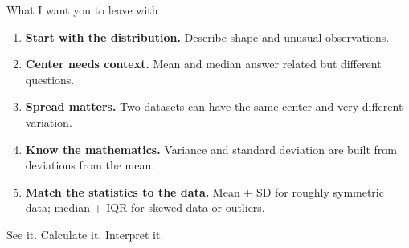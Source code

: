 \documentclass[11pt,aspectratio=169]{beamer}
\begin{document}
\begin{frame}{What I want you to leave with}
\begin{enumerate}
  \item \textbf{Start with the distribution.} Describe shape and unusual observations.
  \item \textbf{Center needs context.} Mean and median answer related but different questions.
  \item \textbf{Spread matters.} Two datasets can have the same center and very different variation.
  \item \textbf{Know the mathematics.} Variance and standard deviation are built from deviations from the mean.
  \item \textbf{Match the statistics to the data.} Mean + SD for roughly symmetric data; median + IQR for skewed data or outliers.
\end{enumerate}

\vfill
\begin{center}
\Large \alert{See it. Calculate it. Interpret it.}
\end{center}
\end{frame}
\end{document}
